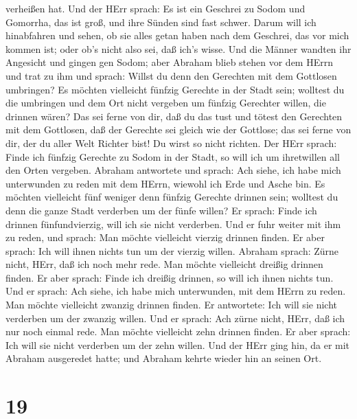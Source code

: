 verheißen hat.  Und der HErr sprach: Es ist ein Geschrei zu
Sodom und Gomorrha, das ist groß, und ihre Sünden sind fast schwer.
 Darum will ich hinabfahren und sehen, ob sie alles getan
haben nach dem Geschrei, das vor mich kommen ist; oder ob's nicht also
sei, daß ich's wisse.  Und die Männer wandten ihr Angesicht
und gingen gen Sodom; aber Abraham blieb stehen vor dem HErrn
 und trat zu ihm und sprach: Willst du denn den Gerechten
mit dem Gottlosen umbringen?  Es möchten vielleicht fünfzig
Gerechte in der Stadt sein; wolltest du die umbringen und dem Ort nicht
vergeben um fünfzig Gerechter willen, die drinnen wären? 
Das sei ferne von dir, daß du das tust und tötest den Gerechten mit dem
Gottlosen, daß der Gerechte sei gleich wie der Gottlose; das sei ferne
von dir, der du aller Welt Richter bist! Du wirst so nicht richten.
 Der HErr sprach: Finde ich fünfzig Gerechte zu Sodom in
der Stadt, so will ich um ihretwillen all den Orten vergeben.
 Abraham antwortete und sprach: Ach siehe, ich habe mich
unterwunden zu reden mit dem HErrn, wiewohl ich Erde und Asche bin.
 Es möchten vielleicht fünf weniger denn fünfzig Gerechte
drinnen sein; wolltest du denn die ganze Stadt verderben um der fünfe
willen? Er sprach: Finde ich drinnen fünfundvierzig, will ich sie nicht
verderben.  Und er fuhr weiter mit ihm zu reden, und
sprach: Man möchte vielleicht vierzig drinnen finden. Er aber sprach:
Ich will ihnen nichts tun um der vierzig willen.  Abraham
sprach: Zürne nicht, HErr, daß ich noch mehr rede. Man möchte vielleicht
dreißig drinnen finden. Er aber sprach: Finde ich dreißig drinnen, so
will ich ihnen nichts tun.  Und er sprach: Ach siehe, ich
habe mich unterwunden, mit dem HErrn zu reden. Man möchte vielleicht
zwanzig drinnen finden. Er antwortete: Ich will sie nicht verderben um
der zwanzig willen.  Und er sprach: Ach zürne nicht, HErr,
daß ich nur noch einmal rede. Man möchte vielleicht zehn drinnen finden.
Er aber sprach: Ich will sie nicht verderben um der zehn willen.
 Und der HErr ging hin, da er mit Abraham ausgeredet hatte;
und Abraham kehrte wieder hin an seinen Ort.

\hypertarget{section-18}{%
\section{19}\label{section-18}}

